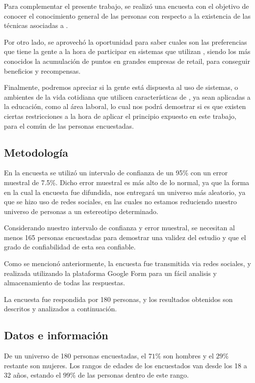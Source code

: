 Para complementar el presente trabajo, se realizó una encuesta con el objetivo de
conocer el conocimiento general de las personas con respecto a la existencia
de las técnicas asociadas a {\GAM}.

Por otro lado, se aprovechó la oportunidad para saber cuales son las preferencias
que tiene la gente a la hora de participar en sistemas que utilizan {\GAM},
siendo los más conocidos la acumulación de puntos en grandes empresas de retail,
para conseguir beneficios y recompensas.

Finalmente, podremos apreciar si la gente está dispuesta al uso de sistemas,
o ambientes de la vida cotidiana que utilicen características de {\GAM},
ya sean aplicadas a la educación, como al área laboral, lo cual nos podrá
demostrar si es que existen ciertas restricciones a la hora de aplicar
el principio expuesto en este trabajo, para el común de las personas
encuestadas.

\subsection{Metodología}

En la encuesta se utilizó un intervalo de confianza de un 95\% con un error
muestral de 7.5\%. Dicho error muestral es más alto de lo normal, ya que la forma
en la cual la encuesta fue difundida, nos entregará un universo más aleatorio,
 ya que se hizo uso de redes sociales, en las cuales no estamos reduciendo nuestro
 universo de personas a un estereotipo determinado.

Considerando nuestro intervalo de confianza y error muestral, se necesitan al menos 165
personas encuestadas para demostrar una validez del estudio y que el grado de confiabilidad
de esta sea confiable.

Como se mencionó anteriormente, la encuesta fue transmitida via redes sociales,
y realizada utilizando la plataforma Google Form para un fácil analisis y almacenamiento
 de todas las respuestas.

La encuesta fue respondida por 180 personas, y los resultados obtenidos son descritos y
analizados a continuación.

\subsection{Datos e información}

De un universo de 180 personas encuestadas, el $71\%$ son hombres y el $29\%$ restante son mujeres.
Los rangos de edades de los encuestados van desde los 18 a 32 años, estando el $99\%$ de las personas
dentro de este rango.

